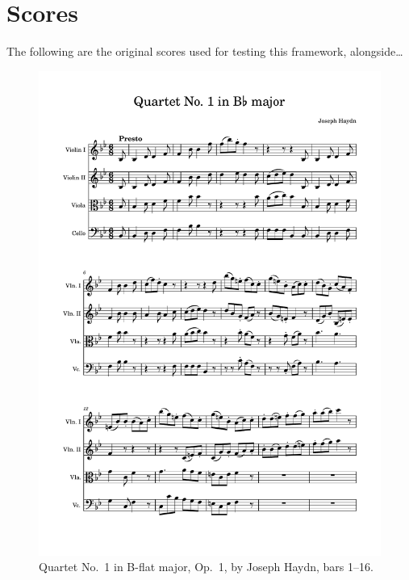 \documentclass[12pt]{article}
\theoremstyle{definition}
\begin{document}
\section{Scores}
\label{app:examples}
\renewcommand{\thefigure}{B\arabic{figure}}

The following are the original scores used for testing this framework, alongside\dots

\begin{figure}
    \includegraphics[width=\textwidth,page=1]{haydn-score.pdf}
    \caption{Quartet No.\ 1 in B-flat major, Op.\ 1, by Joseph Haydn, bars 1--16.}
    \label{fig:haydn-score}
\end{figure}
\end{document}
